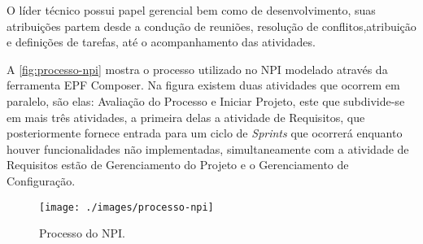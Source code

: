 O líder técnico possui papel gerencial bem como de desenvolvimento, suas atribuições partem desde a condução de reuniões, resolução de conflitos,atribuição e definições de tarefas, até o acompanhamento das atividades. 

A \autoref{fig:processo-npi} mostra o processo utilizado no NPI modelado através da ferramenta EPF Composer. Na figura	existem duas atividades que ocorrem em paralelo, são elas: Avaliação do Processo e Iniciar Projeto, este que subdivide-se em mais três atividades, a primeira delas a atividade de Requisitos, que posteriormente fornece entrada para um ciclo de \textit{Sprints} que ocorrerá enquanto houver funcionalidades não implementadas, simultaneamente com a atividade de Requisitos estão de Gerenciamento do Projeto e o Gerenciamento de Configuração.
\begin{figure}[H]
\centering
\caption[Processo do NPI]{Processo do NPI.}
\texttt{[image: ./images/processo-npi]}
\label{fig:processo-npi}
\end{figure}


